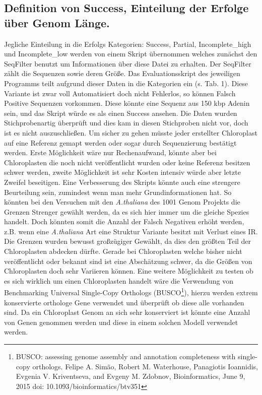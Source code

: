 \documentclass{scrartcl}
\begin{document}
\subsection{Definition von Success, Einteilung der Erfolge über Genom Länge.}
\label{sec-5-1}
Jegliche Einteilung in die Erfolgs Kategorien: Success, Partial, Incomplete\_high und Incomplete\_low werden von einem Skript übernommen welches zunächst den SeqFilter benutzt um Informationen über diese Datei zu erhalten. 
Der SeqFilter zählt die Sequenzen sowie deren Größe. Das Evaluationsskript des jeweiligen Programms teilt aufgrund dieser Daten in die Kategorien ein (s. Tab. 1). Diese Variante ist zwar voll Automatisiert
doch nicht Fehlerlos, so können Falsch Positive Sequenzen vorkommen. Diese könnte eine Sequenz aus 150 kbp Adenin sein, und das Skript würde es als einen Success ansehen. Die Daten wurden Stichprobenartig überprüft und dies 
kam in diesen Stichproben nicht vor, doch ist es nicht auszuschließen. Um sicher zu gehen müsste jeder erstellter Chloroplast auf eine Referenz gemapt werden oder sogar durch Sequenzierung bestätigt werden. Erste Möglichkeit
wäre nur Rechenaufwand, könnte aber bei Chloroplasten die noch nicht veröffentlicht wurden oder keine Referenz besitzen schwer werden, zweite Möglichkeit ist sehr Kosten intensiv würde aber letzte Zweifel beseitigen. 
Eine Verbesserung des Skripts könnte auch eine strengere Beurteilung sein, zumindest wenn man mehr Grundinformationen hat. So könnten bei den Versuchen mit den \emph{A.thaliana} des 1001 Genom Projekts die Grenzen Strenger gewählt werden, 
da es sich hier immer um die gleiche Spezies handelt. Doch könnten somit die Anzahl der Falsch Negativen erhöht werden, z.B. wenn eine \emph{A.thaliana} Art eine Struktur Variante besitzt mit Verlust eines IR. Die Grenzen wurden 
bewusst großzügiger Gewählt, da dies den größten Teil der Chloroplasten abdecken dürfte. Gerade bei Chloroplasten welche bisher nicht veröffentlicht oder bekannt sind ist eine Abschätzung schwer, da die Größen von Chloroplasten
doch sehr Variieren können. Eine weitere Möglichkeit zu testen ob es sich wirklich um einen Chloroplasten handelt wäre die Verwendung von Benchmarking Universal Single-Copy Orthologs (BUSCO\footnote{BUSCO: assessing genome assembly and annotation completeness with single-copy orthologs. Felipe A. Simão, Robert M. Waterhouse, Panagiotis Ioannidis, Evgenia V. Kriventseva, and Evgeny M. Zdobnov, Bioinformatics, June 9, 2015 doi: 10.1093/bioinformatics/btv351}), hierzu werden extrem konservierte
orthologe Gene verwendet und überprüft ob diese alle vorhanden sind. Da ein Chloroplast Genom an sich sehr konserviert ist könnte eine Anzahl von Genen genommen werden und diese in einem solchen Modell verwendet werden. 
\end{document}
